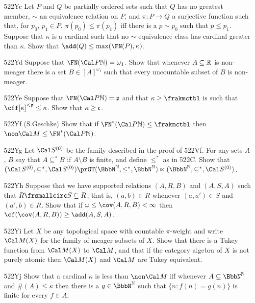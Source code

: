 {\spheader 522Yc Let $P$ and $Q$ be partially ordered sets such that
$Q$ has no greatest member, $\sim$ an
equivalence relation on $P$, and $\pi:P\to Q$ a surjective
function such that, for $p_0$, $p_1\in P$, $\pi(p_0)\le\pi(p_1)$ iff
there is
a $p\sim p_0$ such that $p\le p_1$.   Suppose that $\kappa$ is a cardinal
such that no $\sim$-equivalence class has cardinal greater than $\kappa$.
Show that $\add(Q)\le\max(\FN(P),\kappa)$.

\spheader 522Yd Suppose that $\FN(\Cal P\Bbb N)=\omega_1$.   Show that
whenever $A\subseteq\Bbb R$ is non-meager there is a set
$B\in[A]^{\omega_1}$ such that every uncountable subset of $B$ is
non-meager.

\spheader 522Ye Suppose that $\FN(\Cal P\Bbb N)=\frak p$ and that
$\kappa\ge\frakmctbl$ is such that $\cff[\kappa]^{<\frak p}\le\kappa$.
Show that $\kappa\ge\frak c$.

\spheader 522Yf (S.Geschke)
Show that if $\FN^*(\Cal P\Bbb N)\le\frakmctbl$ then
$\non\Cal M\le\FN^*(\Cal P\Bbb N)$.   

\spheader 522Yg Let $\Cal S^{(0)}$ be the family described in the proof of
522Vf.   For any sets $A$, $B$ say that $A\subseteq^*B$ if $A\setminus B$
is finite, and define $\le^*$ as in 522C.   Show that
$(\Cal S^{(0)},\subseteq^*,\Cal S^{(0)})
\prGT(\NN,\le^*,\penalty-50\NN)\penalty-100\ltimes
(\NN,\subseteq^*,\Cal S^{(0)})$.

\spheader 522Yh Suppose that we have supported relations $(A,R,B)$ and
$(A,S,A)$ such that $R\frsmallcirc S\subseteq R$, that is,
$(a,b)\in R$ whenever $(a,a')\in S$ and $(a',b)\in R$.
Show that if $\omega\le\cov(A,R,B)<\infty$ then
$\cf(\cov(A,R,B))\ge\add(A,S,A)$.

\spheader 522Yi
Let $X$ be any topological space with countable
$\pi$-weight and write $\Cal M(X)$ for the family of meager subsets of
$X$.   Show that there is a Tukey function from $\Cal M(X)$ to $\Cal M$,
and that if the category algebra of $X$ is not purely atomic then
$\Cal M(X)$ and $\Cal M$ are Tukey equivalent.

\spheader 522Yj
Show that a cardinal $\kappa$ is less than $\non\Cal M$ iff whenever
$A\subseteq\NN$ and $\#(A)\le\kappa$ then there is a $g\in\NN$ such that
$\{n:f(n)=g(n)\}$ is finite for every $f\in A$.
}%

